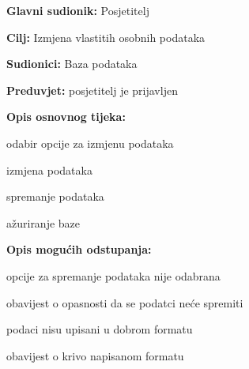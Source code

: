 					\noindent {}
					\begin{packed_item}
	
						\item \textbf{Glavni sudionik: }Posjetitelj
						\item  \textbf{Cilj:} Izmjena vlastitih osobnih podataka
						\item  \textbf{Sudionici:} Baza podataka
						\item  \textbf{Preduvjet:} posjetitelj je prijavljen
						\item  \textbf{Opis osnovnog tijeka:}
						
						\item[] \begin{packed_enum}
	
							\item odabir opcije za izmjenu podataka
							\item izmjena podataka
							\item spremanje podataka 
							\item ažuriranje baze
							
						\end{packed_enum}
						
						\item  \textbf{Opis mogućih odstupanja:}
						
						\item[] \begin{packed_item}
	
							\item[3.a] opcije za spremanje podataka nije odabrana
							\item[] \begin{packed_enum}
								
								\item obavijest o opasnosti da se podatci neće spremiti
								
							\end{packed_enum}
							\item[3.b] podaci nisu upisani u dobrom formatu
							\item[] \begin{packed_enum}
								
								\item obavijest o krivo napisanom formatu
								
							\end{packed_enum}
						
							
						\end{packed_item}
					\end{packed_item}
					

